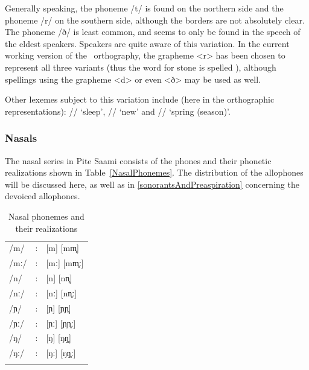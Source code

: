 Generally speaking, the phoneme /t/ is found on the northern side and the phoneme /r/ on the southern side, although the borders are not absolutely clear. The phoneme /ð/ is least common, and seems to only be found in the speech of the eldest speakers.   
Speakers are quite aware of this variation. 
In the current working version of the \PS\ orthography, the grapheme <r> has been chosen to represent all three variants (thus the word for stone is spelled ), although spellings using the grapheme <d> or even <ð> may be used as well. 

Other lexemes subject to this variation include (here in the orthographic representations): 
// ‘sleep’, 
// ‘new’ and 
//  ‘spring (season)’. 

\FB

\subsubsection{Nasals}\label{Nasals}%
The nasal series in Pite Saami consists of the phones and their phonetic realizations shown in Table~\vref{NasalPhonemes}. The distribution of the allophones will be discussed here, as well as in \SEC\ref{sonorantsAndPreaspiration} concerning the devoiced allophones. 
\begin{table}[ht]\centering
\caption{Nasal phonemes and their realizations}\label{NasalPhonemes}
\begin{tabular}{l c l}\mytoprule
/m/ &:& [m] [mm̥] \\ %
/mː/ &:& [mː] [mm̥ː] \\ %
/n/ &:& [n] [nn̥] \\ %
/nː/ &:& [nː] [nn̥ː]\\ %
/ɲ/ &:& [ɲ] [ɲɲ̥]\\ %
/ɲː/ &:& [ɲː] [ɲɲ̥ː]\\ %
/ŋ/ &:& [ŋ] [ŋŋ̥]\\ %
/ŋː/ &:& [ŋː] [ŋŋ̥ː]\\ %
\mybottomrule
\end{tabular}
\end{table}

